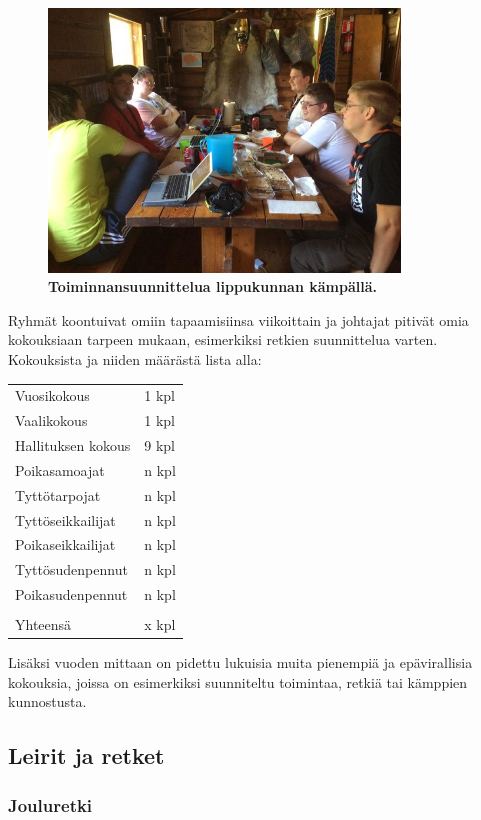 \documentclass[a4paper, 12pt, finnish]{report} %
\begin{document}
\begin{figure}[htb]
	\begin{center}
		\includegraphics[height=7cm]{kokous.jpg}
	\end{center}
	\caption*{\textbf{Toiminnansuunnittelua lippukunnan kämpällä.}}
\end{figure}


Ryhmät koontuivat omiin tapaamisiinsa viikoittain ja johtajat pitivät omia kokouksiaan tarpeen mukaan, esimerkiksi retkien suunnittelua varten. Kokouksista ja niiden määrästä lista alla:\\
\begin{center}
	\begin{tabular}{ l l }
		Vuosikokous & 1 kpl\\
		Vaalikokous & 1 kpl\\
		Hallituksen kokous & 9 kpl\\
		Poikasamoajat & n kpl\\
		Tyttötarpojat & n kpl\\
		Tyttöseikkailijat & n kpl\\
		Poikaseikkailijat & n kpl\\
		Tyttösudenpennut & n kpl\\
		Poikasudenpennut & n kpl\\
						      & \\
		Yhteensä & x kpl\\
	\end{tabular}
\end{center}
Lisäksi vuoden mittaan on pidettu lukuisia muita pienempiä ja epävirallisia kokouksia, joissa on esimerkiksi suunniteltu toimintaa, retkiä tai kämppien kunnostusta.
\subsection{Leirit ja retket}
\subsubsection{Jouluretki}
\end{document}
